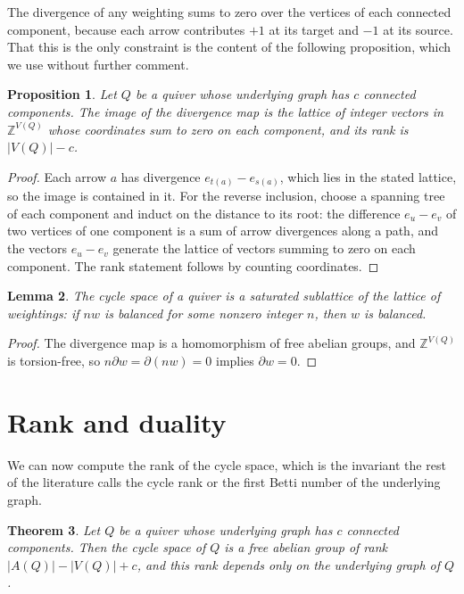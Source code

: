\documentclass[11pt]{article}
\theoremstyle{plain}
\newtheorem{theorem}{Theorem}[section]
\newtheorem{lemma}[theorem]{Lemma}
\newtheorem{proposition}[theorem]{Proposition}
\theoremstyle{definition}
\theoremstyle{remark}
\newcommand{\ZZ}{\mathbb{Z}}
\begin{document}
The divergence of any weighting sums to zero over the vertices of each connected component, because each arrow contributes $+1$ at its target and $-1$ at its source. That this is the only constraint is the content of the following proposition, which we use without further comment.

\begin{proposition}\label{prop:image}
Let $Q$ be a quiver whose underlying graph has $c$ connected components. The image of the divergence map is the lattice of integer vectors in $\ZZ^{V(Q)}$ whose coordinates sum to zero on each component, and its rank is $|V(Q)| - c$.
\end{proposition}

\begin{proof}
Each arrow $a$ has divergence $e_{t(a)} - e_{s(a)}$, which lies in the stated lattice, so the image is contained in it. For the reverse inclusion, choose a spanning tree of each component and induct on the distance to its root: the difference $e_{u} - e_{v}$ of two vertices of one component is a sum of arrow divergences along a path, and the vectors $e_u - e_v$ generate the lattice of vectors summing to zero on each component. The rank statement follows by counting coordinates.
\end{proof}

\begin{lemma}\label{lem:saturated}
The cycle space of a quiver is a saturated sublattice of the lattice of weightings: if $nw$ is balanced for some nonzero integer $n$, then $w$ is balanced.
\end{lemma}

\begin{proof}
The divergence map is a homomorphism of free abelian groups, and $\ZZ^{V(Q)}$ is torsion-free, so $n \partial w = \partial(nw) = 0$ implies $\partial w = 0$.
\end{proof}

\section{Rank and duality}

We can now compute the rank of the cycle space, which is the invariant the rest of the literature calls the cycle rank or the first Betti number of the underlying graph.

\begin{theorem}\label{thm:rank}
Let $Q$ be a quiver whose underlying graph has $c$ connected components. Then the cycle space of $Q$ is a free abelian group of rank $|A(Q)| - |V(Q)| + c$, and this rank depends only on the underlying graph of $Q$.
\end{theorem}
\end{document}
